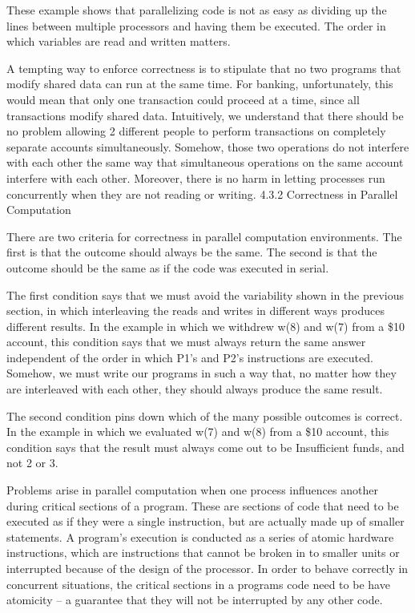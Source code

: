 \documentclass[letterpaper,10pt,dvipdfmx]{sphinxmanual}
\begin{document}
These example shows that parallelizing code is not as easy as dividing up the lines between multiple processors and having them be executed. The order in which variables are read and written matters.

A tempting way to enforce correctness is to stipulate that no two programs that modify shared data can run at the same time. For banking, unfortunately, this would mean that only one transaction could proceed at a time, since all transactions modify shared data. Intuitively, we understand that there should be no problem allowing 2 different people to perform transactions on completely separate accounts simultaneously. Somehow, those two operations do not interfere with each other the same way that simultaneous operations on the same account interfere with each other. Moreover, there is no harm in letting processes run concurrently when they are not reading or writing.
4.3.2   Correctness in Parallel Computation

There are two criteria for correctness in parallel computation environments. The first is that the outcome should always be the same. The second is that the outcome should be the same as if the code was executed in serial.

The first condition says that we must avoid the variability shown in the previous section, in which interleaving the reads and writes in different ways produces different results. In the example in which we withdrew w(8) and w(7) from a \$10 account, this condition says that we must always return the same answer independent of the order in which P1's and P2's instructions are executed. Somehow, we must write our programs in such a way that, no matter how they are interleaved with each other, they should always produce the same result.

The second condition pins down which of the many possible outcomes is correct. In the example in which we evaluated w(7) and w(8) from a \$10 account, this condition says that the result must always come out to be Insufficient funds, and not 2 or 3.

Problems arise in parallel computation when one process influences another during critical sections of a program. These are sections of code that need to be executed as if they were a single instruction, but are actually made up of smaller statements. A program's execution is conducted as a series of atomic hardware instructions, which are instructions that cannot be broken in to smaller units or interrupted because of the design of the processor. In order to behave correctly in concurrent situations, the critical sections in a programs code need to be have atomicity -- a guarantee that they will not be interrupted by any other code.
\end{document}
